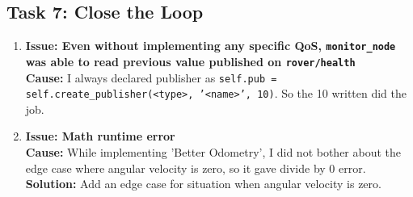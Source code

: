 \documentclass[12pt,a4paper]{article}
\begin{document}
\subsection{Task 7: Close the Loop}
\begin{enumerate}[leftmargin=*]
    \item \textbf{Issue: Even without implementing any specific QoS, \texttt{monitor\_node} was able to read previous value published on \texttt{rover/health}}\\
    \textbf{Cause:} I always declared publisher as \texttt{self.pub = self.create\_publisher(<type>, '<name>', 10)}. So the 10 written did the job.

    \item \textbf{Issue: Math runtime error}\\
    \textbf{Cause:} While implementing 'Better Odometry', I did not bother about the edge case where angular velocity is zero, so it gave divide by 0 error.\\
    \textbf{Solution:} Add an edge case for situation when angular velocity is zero.
\end{enumerate}
\end{document}
